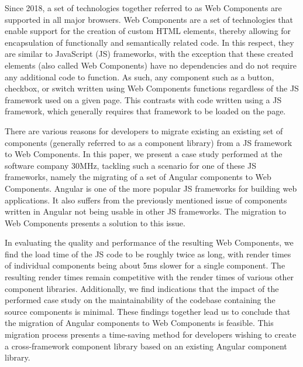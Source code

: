 Since 2018, a set of technologies together referred to as Web Components are supported in all major browsers. Web Components are a set of technologies that enable support for the creation of custom HTML elements, thereby allowing for encapsulation of functionally and semantically related code. In this respect, they are similar to JavaScript (JS) frameworks, with the exception that these created elements (also called Web Components) have no dependencies and do not require any additional code to function. As such, any component such as a button, checkbox, or switch written using Web Components functions regardless of the JS framework used on a given page. This contrasts with code written using a JS framework, which generally requires that framework to be loaded on the page.

There are various reasons for developers to migrate existing an existing set of components (generally referred to as a component library) from a JS framework to Web Components. In this paper, we present a case study performed at the software company 30MHz, tackling such a scenario for one of these JS frameworks, namely the migrating of a set of Angular components to Web Components. Angular is one of the more popular JS frameworks for building web applications. It also suffers from the previously mentioned issue of components written in Angular not being usable in other JS frameworks. The migration to Web Components presents a solution to this issue.

In evaluating the quality and performance of the resulting Web Components, we find the load time of the JS code to be roughly twice as long, with render times of individual components being about 5ms slower for a single component. The resulting render times remain competitive with the render times of various other component libraries. Additionally, we find indications that the impact of the performed case study on the maintainability of the codebase containing the source components is minimal. These findings together lead us to conclude that the migration of Angular components to Web Components is feasible. This migration process presents a time-saving method for developers wishing to create a cross-framework component library based on an existing Angular component library.